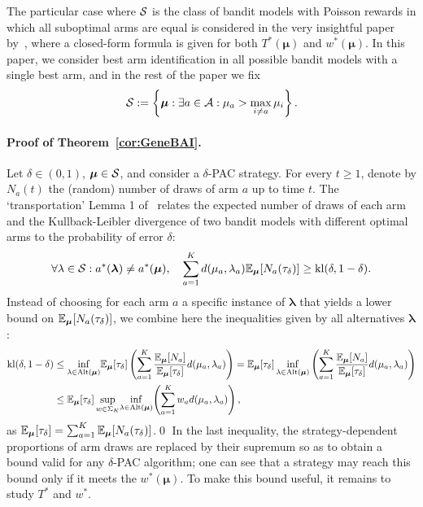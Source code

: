 \documentclass{colt2016} %
\begin{document}
The particular case where $\mathcal{S}$ is the class of bandit models with Poisson rewards in which all suboptimal arms are equal is considered in the very insightful paper by~\cite{Rajesh15Oddball}, where a closed-form formula is given for both $T^*(\bm \mu)$ and $w^*(\bm\mu)$. In this paper, we consider best arm identification in all possible bandit models with a single best arm, and in the rest of the paper we fix 
\begin{equation*}\mathcal{S} := \left\{ \bm \mu : \exists a \in \mathcal{A} : \mu_{a} > \max_{i\neq a} \mu_i \right\}.\end{equation*}

\paragraph{Proof of Theorem~\ref{cor:GeneBAI}.}
Let $\delta \in (0,1)$, $\bm \mu \in \mathcal{S}$, and consider a $\delta$-PAC strategy. 
For every $t\geq 1$, denote by $N_a(t)$ the (random) number of draws of arm $a$ up to time $t$.
The `transportation' Lemma 1 of~\cite{JMLR15} relates the expected number of draws of each arm and the Kullback-Leibler divergence of two bandit models with different optimal arms to the probability of error $\delta$: 
\begin{equation}
\forall \lambda \in \mathcal{S} : a^*(\bm\lambda) \neq a^*(\bm\mu), \ \ \ \sum_{a=1}^K d(\mu_a,\lambda_a) \mathbb{E}_{\bm \mu}[N_a(\tau_\delta)] \geq  \mathrm{kl}(\delta,1-\delta).
 \label{eq:BAI}
\end{equation}
Instead of choosing for each arm $a$ a specific instance of $\bm\lambda$ that yields a lower bound on $\mathbb{E}_{\bm \mu}[N_a(\tau_\delta)]$, we combine here the inequalities given by all alternatives $\bm\lambda$: 
\begin{align*}
\mathrm{kl}(\delta,1-\delta) &\leq  \inf_{\lambda \in \mathrm{Alt}(\bm \mu)} \!\mathbb{E}_{\bm\mu}[\tau_\delta] \left(\sum_{a=1}^{K} \frac{\mathbb{E}_{\bm\mu}[N_a]}{\mathbb{E}_{\bm\mu}[\tau_\delta]}d(\mu_a,\lambda_a)\right) =  \mathbb{E}_{\bm\mu}[\tau_\delta]\inf_{\lambda \in \mathrm{Alt}(\bm \mu)} \left(\sum_{a=1}^{K} \frac{\mathbb{E}_{\bm\mu}[N_a]}{\mathbb{E}_{\bm\mu}[\tau_\delta]}d(\mu_a,\lambda_a)\right)\\
&\leq  \mathbb{E}_{\bm\mu}[\tau_\delta] \sup_{w \in \Sigma_K}\!\inf_{\lambda \in \mathrm{Alt}(\bm \mu)}\! \left(\sum_{a=1}^{K} w_ad(\mu_a,\lambda_a)\right),
\end{align*}
as $\mathbb{E}_{\bm\mu}[\tau_\delta] = \sum_{a=1}^K \mathbb{E}_{\bm\mu}[N_a(\tau_\delta)]$.\qed %
In the last inequality, the strategy-dependent proportions of arm draws are replaced by their supremum so as to obtain a bound valid for any $\delta$-PAC algorithm; one can see that a strategy may reach this bound only if it meets the $w^*(\bm\mu)$.
To make this bound useful, it remains to study $T^*$ and $w^*$.
\end{document}
